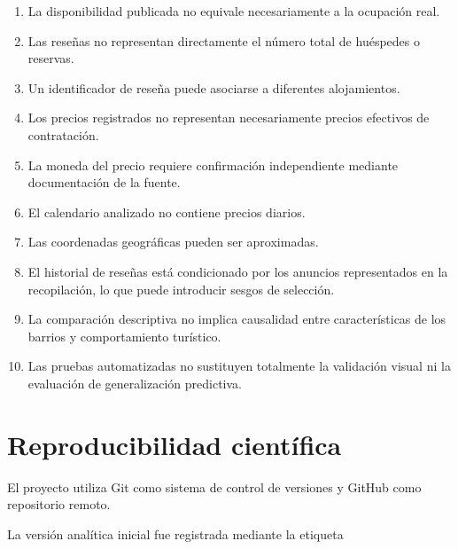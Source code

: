 \documentclass[11pt,a4paper]{article}
\begin{document}
\begin{enumerate}
    \item La disponibilidad publicada no equivale
    necesariamente a la ocupación real.

    \item Las reseñas no representan directamente
    el número total de huéspedes o reservas.

    \item Un identificador de reseña puede asociarse
    a diferentes alojamientos.

    \item Los precios registrados no representan
    necesariamente precios efectivos de contratación.

    \item La moneda del precio requiere confirmación
    independiente mediante documentación de la fuente.

    \item El calendario analizado no contiene
    precios diarios.

    \item Las coordenadas geográficas pueden
    ser aproximadas.

    \item El historial de reseñas está condicionado
    por los anuncios representados en la recopilación,
    lo que puede introducir sesgos de selección.

    \item La comparación descriptiva no implica
    causalidad entre características de los barrios
    y comportamiento turístico.

    \item Las pruebas automatizadas no sustituyen
    totalmente la validación visual ni la evaluación
    de generalización predictiva.
\end{enumerate}


\section{Reproducibilidad científica}

El proyecto \cite{project} utiliza Git como sistema de control
de versiones y GitHub como repositorio remoto.

La versión analítica inicial fue registrada
mediante la etiqueta
\end{document}
